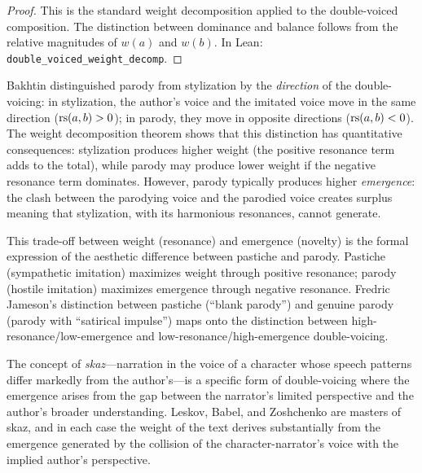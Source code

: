 \begin{proof}
This is the standard weight decomposition applied to the double-voiced composition.  The distinction between dominance and balance follows from the relative magnitudes of $w(a)$ and $w(b)$.  In Lean: \texttt{double\_voiced\_weight\_decomp}.
\end{proof}

\begin{interpretation}
\label{interp:parody-spectrum}
Bakhtin distinguished parody from stylization by the \emph{direction} of the double-voicing: in stylization, the author's voice and the imitated voice move in the same direction ($\mathrm{rs}(a, b) > 0$); in parody, they move in opposite directions ($\mathrm{rs}(a, b) < 0$).  The weight decomposition theorem shows that this distinction has quantitative consequences: stylization produces higher weight (the positive resonance term adds to the total), while parody may produce lower weight if the negative resonance term dominates.  However, parody typically produces higher \emph{emergence}: the clash between the parodying voice and the parodied voice creates surplus meaning that stylization, with its harmonious resonances, cannot generate.

This trade-off between weight (resonance) and emergence (novelty) is the formal expression of the aesthetic difference between pastiche and parody.  Pastiche (sympathetic imitation) maximizes weight through positive resonance; parody (hostile imitation) maximizes emergence through negative resonance.  Fredric Jameson's distinction between pastiche (``blank parody'') and genuine parody (parody with ``satirical impulse'') maps onto the distinction between high-resonance/low-emergence and low-resonance/high-emergence double-voicing.

The concept of \emph{skaz}---narration in the voice of a character whose speech patterns differ markedly from the author's---is a specific form of double-voicing where the emergence arises from the gap between the narrator's limited perspective and the author's broader understanding.  Leskov, Babel, and Zoshchenko are masters of skaz, and in each case the weight of the text derives substantially from the emergence generated by the collision of the character-narrator's voice with the implied author's perspective.
\end{interpretation}

